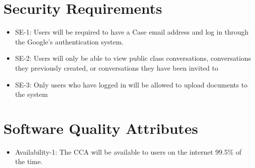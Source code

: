 \documentclass{scrreprt}
\begin{document}
\section{Security Requirements}
\begin{itemize}
	\item SE-1: Users will be required to have a Case email address and log in through the Google’s authentication system.
	\item SE-2: Users will only be able to view public class conversations, conversations they previously created, or conversations they have been invited to
	\item SE-3: Only users who have logged in will be allowed to upload documents to the system
\end{itemize}

\section{Software Quality Attributes}
\begin{itemize}
	\item Availability-1: The CCA will be available to users on the internet 99.5\% of the time.
\end{itemize}
\end{document}
